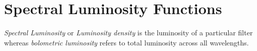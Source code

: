 \section{Spectral Luminosity Functions}
\textit{Spectral Luminosity} or \textit{Luminosity density} is the luminosity of a particular filter whereas \textit{bolometric luminosity} refers to total luminosity across all wavelengths.